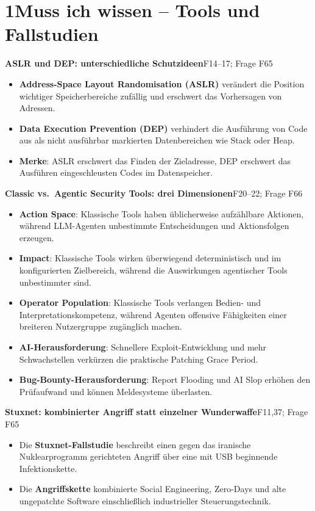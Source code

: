 \documentclass[11pt,a4paper]{article}
\newcommand{\block}[2]{\par\vspace{5pt}\textbf{#1}\hfill{\scriptsize #2}\par\nopagebreak}
\begin{document}
\section*{1\quad Muss ich wissen -- Tools und Fallstudien}
\block{ASLR und DEP: unterschiedliche Schutzideen}{F14--17; Frage F65}
\begin{itemize}
\item \textbf{Address-Space Layout Randomisation (ASLR)} verändert die Position wichtiger Speicherbereiche zufällig und erschwert das Vorhersagen von Adressen.
\item \textbf{Data Execution Prevention (DEP)} verhindert die Ausführung von Code aus als nicht ausführbar markierten Datenbereichen wie Stack oder Heap.
\item \textbf{Merke}: ASLR erschwert das Finden der Zieladresse, DEP erschwert das Ausführen eingeschleusten Codes im Datenspeicher.
\end{itemize}
\block{Classic vs.\ Agentic Security Tools: drei Dimensionen}{F20--22; Frage F66}
\begin{itemize}
\item \textbf{Action Space}: Klassische Tools haben üblicherweise aufzählbare Aktionen, während LLM-Agenten unbestimmte Entscheidungen und Aktionsfolgen erzeugen.
\item \textbf{Impact}: Klassische Tools wirken überwiegend deterministisch und im konfigurierten Zielbereich, während die Auswirkungen agentischer Tools unbestimmter sind.
\item \textbf{Operator Population}: Klassische Tools verlangen Bedien- und Interpretationskompetenz, während Agenten offensive Fähigkeiten einer breiteren Nutzergruppe zugänglich machen.
\item \textbf{AI-Herausforderung}: Schnellere Exploit-Entwicklung und mehr Schwachstellen verkürzen die praktische Patching Grace Period.
\item \textbf{Bug-Bounty-Herausforderung}: Report Flooding und AI Slop erhöhen den Prüfaufwand und können Meldesysteme überlasten.
\end{itemize}
\block{Stuxnet: kombinierter Angriff statt einzelner Wunderwaffe}{F11,37; Frage F65}
\begin{itemize}
\item Die \textbf{Stuxnet-Fallstudie} beschreibt einen gegen das iranische Nuklearprogramm gerichteten Angriff über eine mit USB beginnende Infektionskette.
\item Die \textbf{Angriffskette} kombinierte Social Engineering, Zero-Days und alte ungepatchte Software einschließlich industrieller Steuerungstechnik.
\end{itemize}
\end{document}
